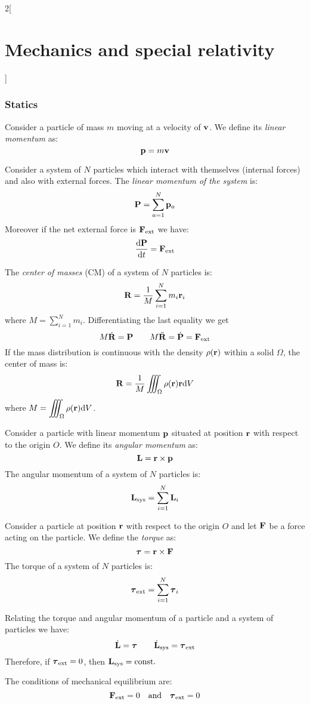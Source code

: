 \documentclass[../../../main.tex]{subfiles}
\begin{document}
\begin{multicols}{2}[\section{Mechanics and special relativity}]
  \subsubsection*{Statics}
  \begin{definition}
    Consider a particle of mass $m$ moving at a velocity of $\vb{v}$. We define its \textit{linear momentum} as:
    $$\vb{p}=m\vb{v}$$
  \end{definition}
  \begin{prop}
    Consider a system of $N$ particles which interact with themselves (internal forces) and also with external forces. The \textit{linear momentum of the system} is: $$\vb{P}=\sum_{a=1}^N\vb{p}_a$$ Moreover if the net external force is $\vb{F}_\text{ext}$ we have:
    $$\dv{\vb{P}}{t}=\vb{F}_\text{ext}$$
  \end{prop}
  \begin{prop}
    The \textit{center of masses} (CM) of a system of $N$ particles is: $$\vb{R}=\frac{1}{M}\sum_{i=1}^Nm_i\vb{r}_i$$ where $\displaystyle M=\sum_{i=1}^Nm_i$. Differentiating the last equality we get
    $$M\dot{\vb{R}}=\vb{P}\qquad M\ddot{\vb{R}}=\dot{\vb{P}}=\vb{F}_\text{ext}$$
    If the mass distribution is continuous with the density $\rho(\vb{r})$ within a solid $\Omega$, the center of mass is: $$\vb{R}=\frac{1}{M}\iiint_\Omega\rho(\vb{r})\vb{r}\dd V$$ where $\displaystyle M=\iiint_\Omega\rho(\vb{r})\dd V$.
  \end{prop}
  \begin{prop}
    Consider a particle with linear momentum $\vb{p}$ situated at position $\vb{r}$ with respect to the origin $O$. We define its \textit{angular momentum} as: $$\vb{L}=\vb{r}\times\vb{p}$$ The angular momentum of a system of $N$ particles is: $$\vb{L}_\text{sys}=\sum_{i=1}^N\vb{L}_i$$
  \end{prop}
  \begin{prop}[Torque]
    Consider a particle at position $\vb{r}$ with respect to the origin $O$ and let $\vb{F}$ be a force acting on the particle. We define the \textit{torque} as: $$\vb*{\tau}=\vb{r}\times\vb{F}$$ The torque of a system of $N$ particles is: $$\vb*{\tau}_\text{ext}=\sum_{i=1}^N\vb*{\tau}_i$$
  \end{prop}
  \begin{prop}
    Relating the torque and angular momentum of a particle and a system of particles we have:
    $$\dot{\vb{L}}=\vb*{\tau}\qquad\dot{\vb{L}}_\text{sys}=\vb*{\tau}_\text{ext}$$ Therefore, if $\vb*{\tau}_\text{ext}=0$, then $\vb{L}_\text{sys}=\text{const}.$
  \end{prop}
  \begin{definition}
    The conditions of mechanical equilibrium are: $$\vb{F}_\text{ext}=0\quad\text{and}\quad\vb*{\tau}_\text{ext}=0$$
  \end{definition}

\end{multicols}
\end{document}
